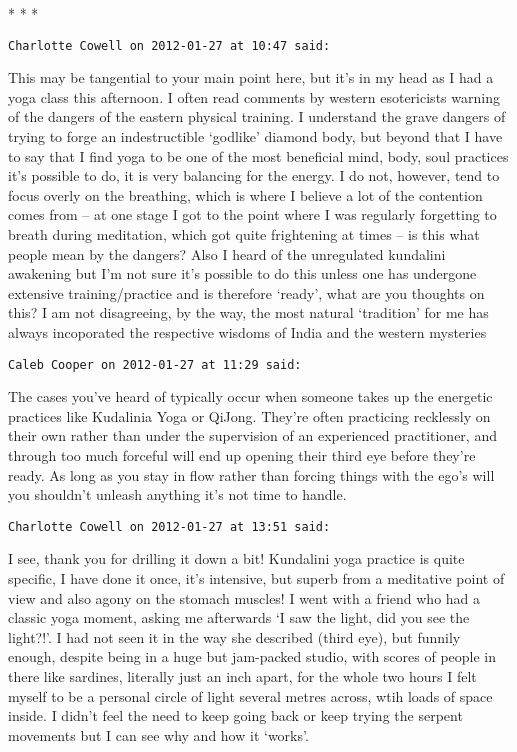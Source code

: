 
\begin{center}* * *\end{center}

\begin{footnotesize}\begin{sffamily}

\texttt{Charlotte Cowell on 2012-01-27 at 10:47 said: }

This may be tangential to your main point here, but it's in my head as I had a yoga class this afternoon. I often read comments by western esotericists warning of the dangers of the eastern physical training. I understand the grave dangers of trying to forge an indestructible `godlike' diamond body, but beyond that I have to say that I find yoga to be one of the most beneficial mind, body, soul practices it's possible to do, it is very balancing for the energy. I do not, however, tend to focus overly on the breathing, which is where I believe a lot of the contention comes from – at one stage I got to the point where I was regularly forgetting to breath during meditation, which got quite frightening at times – is this what people mean by the dangers? Also I heard of the unregulated kundalini awakening but I'm not sure it's possible to do this unless one has undergone extensive training/practice and is therefore `ready', what are you thoughts on this? I am not disagreeing, by the way, the most natural `tradition' for me has always incoporated the respective wisdoms of India and the western mysteries


\hfill

\texttt{Caleb Cooper on 2012-01-27 at 11:29 said: }

The cases you've heard of typically occur when someone takes up the energetic practices like Kudalinia Yoga or QiJong. They're often practicing recklessly on their own rather than under the supervision of an experienced practitioner, and through too much forceful will end up opening their third eye before they're ready. As long as you stay in flow rather than forcing things with the ego's will you shouldn't unleash anything it's not time to handle.


\hfill

\texttt{Charlotte Cowell on 2012-01-27 at 13:51 said: }

I see, thank you for drilling it down a bit! Kundalini yoga practice is quite specific, I have done it once, it's intensive, but superb from a meditative point of view and also agony on the stomach muscles! I went with a friend who had a classic yoga moment, asking me afterwards `I saw the light, did you see the light?!'. I had not seen it in the way she described (third eye), but funnily enough, despite being in a huge but jam-packed studio, with scores of people in there like sardines, literally just an inch apart, for the whole two hours I felt myself to be a personal circle of light several metres across, wtih loads of space inside. I didn't feel the need to keep going back or keep trying the serpent movements but I can see why and how it `works'.

\hfill

\end{sffamily}\end{footnotesize}
